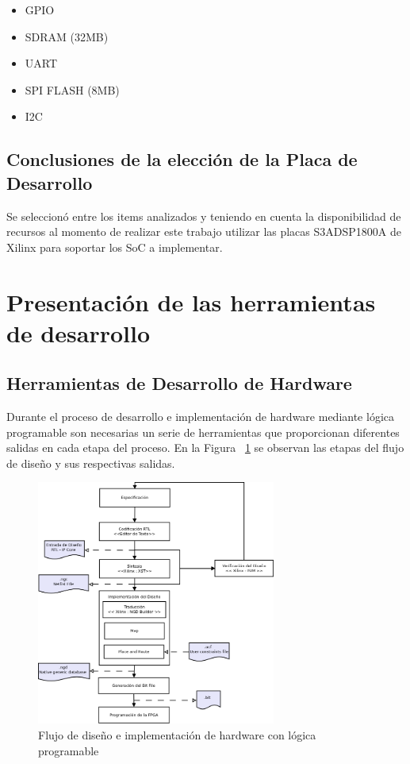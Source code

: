 				\begin{itemize}
				  	\item GPIO
					\item SDRAM (32MB)
					\item UART
					\item SPI FLASH (8MB)
					\item I2C
				\end{itemize}				
				
 		\subsection{Conclusiones de la elección de la Placa de Desarrollo}
 				Se seleccionó entre los items analizados y teniendo en cuenta la disponibilidad de recursos al momento de realizar este trabajo utilizar las
 				placas S3ADSP1800A de Xilinx para soportar los SoC a implementar.
 		
 		\newpage	
 		\section{Presentación de las herramientas de desarrollo} 	 
 				\subsection {Herramientas de Desarrollo de Hardware}
 				Durante el proceso de desarrollo e implementación de hardware mediante lógica programable son necesarias un serie de herramientas que
 				proporcionan diferentes salidas en cada etapa del proceso. En la Figura ~\ref{fig:designflow} se observan las etapas del flujo de diseño y sus
 				respectivas salidas.
 				
 		\begin{figure}[h!]
 		\begin{center}
  		\includegraphics[width=0.7\textwidth,keepaspectratio=true]{./images/designflow}
  		\caption{Flujo de diseño e implementación de hardware con lógica programable}
  		\label{fig:designflow}
 		\end{center}
		\end{figure}
		

